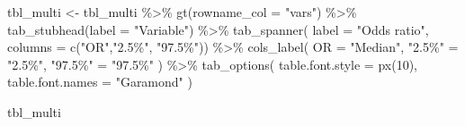\documentclass[
  letterpaper,
  DIV=11,
  numbers=noendperiod]{scrartcl}
\newenvironment{Shaded}{\begin{snugshade}}{\end{snugshade}}
\newcommand{\AttributeTok}[1]{\textcolor[rgb]{0.40,0.45,0.13}{#1}}
\newcommand{\DecValTok}[1]{\textcolor[rgb]{0.68,0.00,0.00}{#1}}
\newcommand{\FunctionTok}[1]{\textcolor[rgb]{0.28,0.35,0.67}{#1}}
\newcommand{\NormalTok}[1]{\textcolor[rgb]{0.00,0.23,0.31}{#1}}
\newcommand{\OtherTok}[1]{\textcolor[rgb]{0.00,0.23,0.31}{#1}}
\newcommand{\SpecialCharTok}[1]{\textcolor[rgb]{0.37,0.37,0.37}{#1}}
\newcommand{\StringTok}[1]{\textcolor[rgb]{0.13,0.47,0.30}{#1}}
\begin{document}
\begin{Shaded}
\begin{Highlighting}[]
\NormalTok{tbl\_multi }\OtherTok{\textless{}{-}}\NormalTok{ tbl\_multi }\SpecialCharTok{\%\textgreater{}\%} 
  \FunctionTok{gt}\NormalTok{(}\AttributeTok{rowname\_col =} \StringTok{"vars"}\NormalTok{)  }\SpecialCharTok{\%\textgreater{}\%} 
   \FunctionTok{tab\_stubhead}\NormalTok{(}\AttributeTok{label =} \StringTok{"Variable"}\NormalTok{) }\SpecialCharTok{\%\textgreater{}\%} 
  \FunctionTok{tab\_spanner}\NormalTok{(}
    \AttributeTok{label =} \StringTok{"Odds ratio"}\NormalTok{,}
    \AttributeTok{columns =} \FunctionTok{c}\NormalTok{(}\StringTok{"OR"}\NormalTok{,}\StringTok{"2.5\%"}\NormalTok{, }\StringTok{"97.5\%"}\NormalTok{)) }\SpecialCharTok{\%\textgreater{}\%} 
  \FunctionTok{cols\_label}\NormalTok{(}
    \AttributeTok{OR =} \StringTok{"Median"}\NormalTok{,}
    \StringTok{"2.5\%"} \OtherTok{=} \StringTok{"2.5\%"}\NormalTok{,}
    \StringTok{"97.5\%"} \OtherTok{=} \StringTok{"97.5\%"}
\NormalTok{  ) }\SpecialCharTok{\%\textgreater{}\%} 
  \FunctionTok{tab\_options}\NormalTok{(}
    \AttributeTok{table.font.style =} \FunctionTok{px}\NormalTok{(}\DecValTok{10}\NormalTok{),}
    \AttributeTok{table.font.names =} \StringTok{"Garamond"}
\NormalTok{  )}

\NormalTok{tbl\_multi}
\end{Highlighting}
\end{Shaded}

\begin{table}

\caption{\label{tbl-multi}Multivariate analysis for round 2 rank}


\end{table}%
\end{document}
